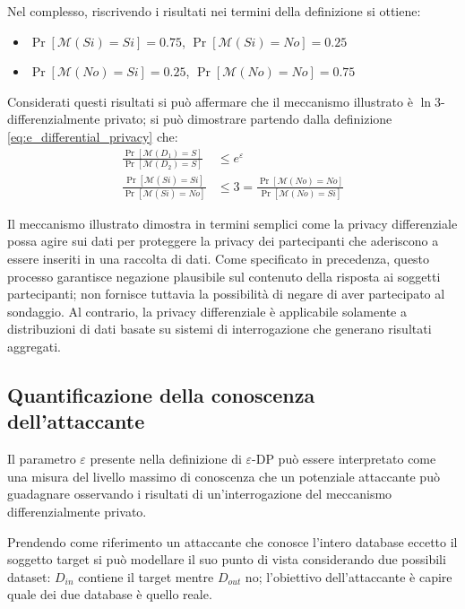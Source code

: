 Nel complesso, riscrivendo i risultati nei termini della definizione si ottiene:
\begin{itemize}
    \item $\Pr[\mathcal{M}(Si) = Si] = 0.75$, $\Pr[\mathcal{M}(Si) = No] = 0.25$
    \item $\Pr[\mathcal{M}(No) = Si] = 0.25$, $\Pr[\mathcal{M}(No) = No] = 0.75$
\end{itemize}

Considerati questi risultati si può affermare che il meccanismo illustrato è $\ln{3}$-differenzialmente privato; si può dimostrare partendo dalla definizione \eqref{eq:e_differential_privacy} che:
\begin{align*}
    \frac{\Pr[\mathcal{M}(D_1) = S]}{\Pr[\mathcal{M}(D_2) = S]
    } &\le e^{\varepsilon}\\
    \frac{\Pr[\mathcal{M}(Si) = Si]}{\Pr[\mathcal{M}(Si) = No]} &\le 3 = \frac{\Pr[\mathcal{M}(No) = No]}{\Pr[\mathcal{M}(No) = Si]}
\end{align*}

Il meccanismo illustrato dimostra in termini semplici come la privacy differenziale possa agire sui dati per proteggere la privacy dei partecipanti che aderiscono a essere inseriti in una raccolta di dati. Come specificato in precedenza, questo processo garantisce negazione plausibile sul contenuto della risposta ai soggetti partecipanti; non fornisce tuttavia la possibilità di negare di aver partecipato al sondaggio. Al contrario, la privacy differenziale è applicabile solamente a distribuzioni di dati basate su sistemi di interrogazione che generano risultati aggregati.

\subsection{Quantificazione della conoscenza dell'attaccante}
Il parametro $\varepsilon$ presente nella definizione di $\varepsilon$-DP può essere interpretato come una misura del livello massimo di conoscenza che un potenziale attaccante può guadagnare osservando i risultati di un'interrogazione del meccanismo differenzialmente privato.

Prendendo come riferimento un attaccante che conosce l'intero database eccetto il soggetto target si può modellare il suo punto di vista considerando due possibili dataset: $D_{in}$ contiene il target mentre $D_{out}$ no; l'obiettivo dell'attaccante è capire quale dei due database è quello reale.

